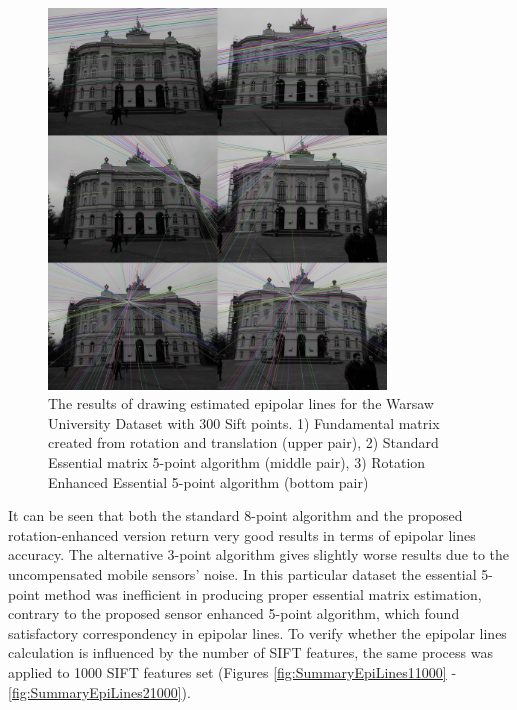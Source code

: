\begin{figure}[ht!]
    \centering
    \includegraphics[width=0.8\textwidth]{summary2Sift300}
    \caption[The results of drawing estimated epipolar lines for the Warsaw University Dataset with 300 Sift points (2nd group)]{The results of drawing estimated epipolar lines for the Warsaw University Dataset with 300 Sift points. 1) Fundamental matrix created from rotation and translation (upper pair), 2) Standard Essential matrix 5-point algorithm (middle pair), 3) Rotation Enhanced Essential 5-point algorithm (bottom pair) }
    \label{fig:SummaryEpiLines2300}
\end{figure}
It can be seen that both the standard 8-point algorithm and the proposed rotation-enhanced version return very good results in terms of epipolar lines accuracy. The alternative 3-point algorithm gives slightly worse results due to the uncompensated mobile sensors' noise. In this particular dataset the essential 5-point method was inefficient in producing proper essential matrix estimation, contrary to the proposed sensor enhanced 5-point algorithm, which found satisfactory correspondency in epipolar lines. \newline
To verify whether the epipolar lines calculation is influenced by the number of SIFT features, the same process was applied to 1000 SIFT features set (Figures \ref{fig:SummaryEpiLines11000} - \ref{fig:SummaryEpiLines21000}). 
